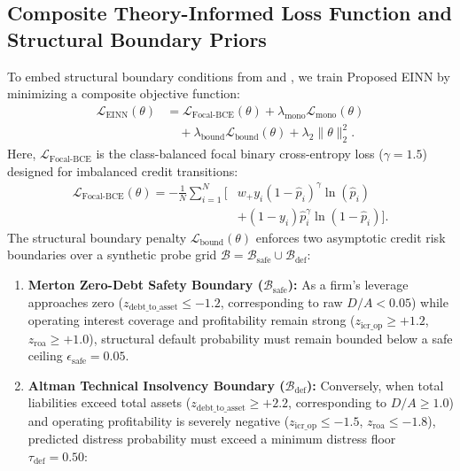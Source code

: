\documentclass[pdflatex,sn-mathphys-num,twocolumn]{sn-jnl}
\theoremstyle{thmstyleone}
\theoremstyle{thmstyletwo}
\theoremstyle{thmstylethree}
\begin{document}
\subsection{Composite Theory-Informed Loss Function and Structural Boundary Priors}
To embed structural boundary conditions from \citet{merton1974pricing} and \citet{altman1995emerging}, we train Proposed EINN by minimizing a composite objective function:
\begin{equation}
\begin{aligned}
    \mathcal{L}_{\text{EINN}}(\theta) &= \mathcal{L}_{\text{Focal-BCE}}(\theta) + \lambda_{\text{mono}} \mathcal{L}_{\text{mono}}(\theta) \\
    &\quad + \lambda_{\text{bound}} \mathcal{L}_{\text{bound}}(\theta) + \lambda_2 \|\theta\|_2^2.
\end{aligned}
\label{eq:total_loss}
\end{equation}
Here, $\mathcal{L}_{\text{Focal-BCE}}$ is the class-balanced focal binary cross-entropy loss ($\gamma = 1.5$) designed for imbalanced credit transitions:
\begin{equation}
\begin{aligned}
    \mathcal{L}_{\text{Focal-BCE}}(\theta) = -\frac{1}{N}\sum_{i=1}^N \Big[ &w_+ y_i (1 - \hat{p}_i)^\gamma \ln(\hat{p}_i) \\
    &+ (1 - y_i)\hat{p}_i^\gamma \ln(1 - \hat{p}_i) \Big].
\end{aligned}
\end{equation}
The structural boundary penalty $\mathcal{L}_{\text{bound}}(\theta)$ enforces two asymptotic credit risk boundaries over a synthetic probe grid $\mathcal{B} = \mathcal{B}_{\text{safe}} \cup \mathcal{B}_{\text{def}}$:
\begin{enumerate}
    \item \textbf{Merton Zero-Debt Safety Boundary ($\mathcal{B}_{\text{safe}}$):} As a firm's leverage approaches zero ($z_{\text{debt\_to\_asset}} \le -1.2$, corresponding to raw $D/A < 0.05$) while operating interest coverage and profitability remain strong ($z_{\text{icr\_op}} \ge +1.2$, $z_{\text{roa}} \ge +1.0$), structural default probability must remain bounded below a safe ceiling $\epsilon_{\text{safe}} = 0.05$.
    \item \textbf{Altman Technical Insolvency Boundary ($\mathcal{B}_{\text{def}}$):} Conversely, when total liabilities exceed total assets ($z_{\text{debt\_to\_asset}} \ge +2.2$, corresponding to $D/A \ge 1.0$) and operating profitability is severely negative ($z_{\text{icr\_op}} \le -1.5$, $z_{\text{roa}} \le -1.8$), predicted distress probability must exceed a minimum distress floor $\tau_{\text{def}} = 0.50$:
\end{enumerate}
\end{document}
